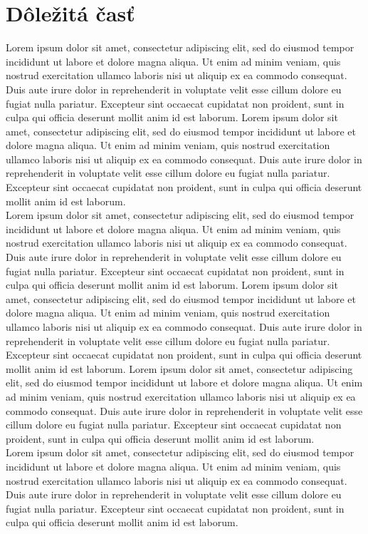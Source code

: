 \documentclass[10pt,twocolumn,twoside,slovak,a4paper]{article}
\begin{document}
\section{Dôležitá časť} \label{dolezita}
Lorem ipsum dolor sit amet, consectetur adipiscing elit, sed do eiusmod tempor incididunt ut labore et dolore magna aliqua. Ut enim ad minim veniam, quis nostrud exercitation ullamco laboris nisi ut aliquip ex ea commodo consequat. Duis aute irure dolor in reprehenderit in voluptate velit esse cillum dolore eu fugiat nulla pariatur. Excepteur sint occaecat cupidatat non proident, sunt in culpa qui officia deserunt mollit anim id est laborum.
Lorem ipsum dolor sit amet, consectetur adipiscing elit, sed do eiusmod tempor incididunt ut labore et dolore magna aliqua. Ut enim ad minim veniam, quis nostrud exercitation ullamco laboris nisi ut aliquip ex ea commodo consequat. Duis aute irure dolor in reprehenderit in voluptate velit esse cillum dolore eu fugiat nulla pariatur. Excepteur sint occaecat cupidatat non proident, sunt in culpa qui officia deserunt mollit anim id est laborum.
\\Lorem ipsum dolor sit amet, consectetur adipiscing elit, sed do eiusmod tempor incididunt ut labore et dolore magna aliqua. Ut enim ad minim veniam, quis nostrud exercitation ullamco laboris nisi ut aliquip ex ea commodo consequat. Duis aute irure dolor in reprehenderit in voluptate velit esse cillum dolore eu fugiat nulla pariatur. Excepteur sint occaecat cupidatat non proident, sunt in culpa qui officia deserunt mollit anim id est laborum.
Lorem ipsum dolor sit amet, consectetur adipiscing elit, sed do eiusmod tempor incididunt ut labore et dolore magna aliqua. Ut enim ad minim veniam, quis nostrud exercitation ullamco laboris nisi ut aliquip ex ea commodo consequat. Duis aute irure dolor in reprehenderit in voluptate velit esse cillum dolore eu fugiat nulla pariatur. Excepteur sint occaecat cupidatat non proident, sunt in culpa qui officia deserunt mollit anim id est laborum.
Lorem ipsum dolor sit amet, consectetur adipiscing elit, sed do eiusmod tempor incididunt ut labore et dolore magna aliqua. Ut enim ad minim veniam, quis nostrud exercitation ullamco laboris nisi ut aliquip ex ea commodo consequat. Duis aute irure dolor in reprehenderit in voluptate velit esse cillum dolore eu fugiat nulla pariatur. Excepteur sint occaecat cupidatat non proident, sunt in culpa qui officia deserunt mollit anim id est laborum.
\\Lorem ipsum dolor sit amet, consectetur adipiscing elit, sed do eiusmod tempor incididunt ut labore et dolore magna aliqua. Ut enim ad minim veniam, quis nostrud exercitation ullamco laboris nisi ut aliquip ex ea commodo consequat. Duis aute irure dolor in reprehenderit in voluptate velit esse cillum dolore eu fugiat nulla pariatur. Excepteur sint occaecat cupidatat non proident, sunt in culpa qui officia deserunt mollit anim id est laborum.
\end{document}
